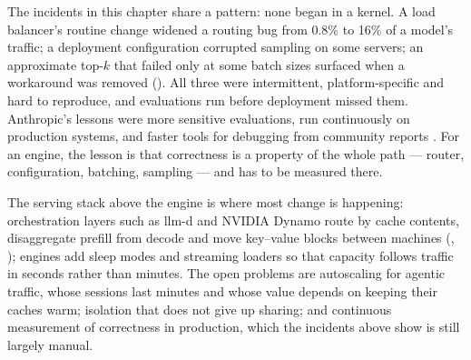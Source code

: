 


The incidents in this chapter share a pattern: none began in a kernel. A load
balancer's routine change widened a routing bug from 0.8\% to 16\% of a model's
traffic; a deployment configuration corrupted sampling on some servers; an
approximate top-$k$ that failed only at some batch sizes surfaced when a
workaround was removed (). All three were intermittent,
platform-specific and hard to reproduce, and evaluations run before deployment
missed them. Anthropic's lessons were more sensitive evaluations, run
continuously on production systems, and faster tools for debugging from
community reports \cite{anthropic2025postmortem}. For an engine, the lesson is
that correctness is a property of the whole path --- router, configuration,
batching, sampling --- and has to be measured there.


The serving stack above the engine is where most change is happening:
orchestration layers such as llm-d and NVIDIA Dynamo route by cache contents,
disaggregate prefill from decode and move key--value blocks between machines
(, ); engines add sleep modes
and streaming loaders so that capacity follows traffic in seconds rather than
minutes. The open problems are autoscaling for agentic traffic, whose sessions
last minutes and whose value depends on keeping their caches warm; isolation
that does not give up sharing; and continuous measurement of correctness in
production, which the incidents above show is still largely manual.

\ExercisesSection

